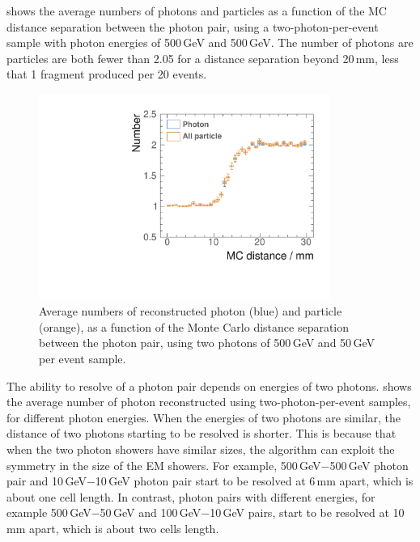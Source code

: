  shows  the average numbers of photons and particles  as a function of the MC distance separation between the photon pair, using a two-photon-per-event sample with photon energies of  500\,GeV and 500\,GeV. The number of photons are particles are  both fewer than 2.05 for a distance separation beyond 20\,mm, less that 1 fragment produced per 20 events.



\begin{figure}[tbph]
\centering
        \includegraphics[width=0.85\textwidth]{photon/DoubleN_pN_all.pdf}
        \caption{Average numbers of reconstructed photon  (blue) and particle (orange), as a function of the Monte Carlo distance separation between the photon pair, using two photons of 500\,GeV and 50\,GeV per event sample. }
        \label{fig:photonDoubleCompareN_pN_all}
\end{figure}

The ability to  resolve of a photon pair depends on energies of two photons.  shows the average number of photon reconstructed using two-photon-per-event samples, for different photon energies. When the energies of two photons are similar, the distance of two photons starting to be resolved is shorter. This is because that when the two photon showers have similar sizes, the \peakFinding algorithm can exploit the symmetry in the size of the EM showers. For example, 500\,GeV$-$500\,GeV photon pair and 10\,GeV$-$10\,GeV photon pair start to be resolved at 6\,mm apart, which is about one \ECAL cell length. In contrast, photon pairs with different energies, for example 500\,GeV$-$50\,GeV and  100\,GeV$-$10\,GeV pairs, start to be resolved at 10\,mm apart, which is about two \ECAL cells length.

